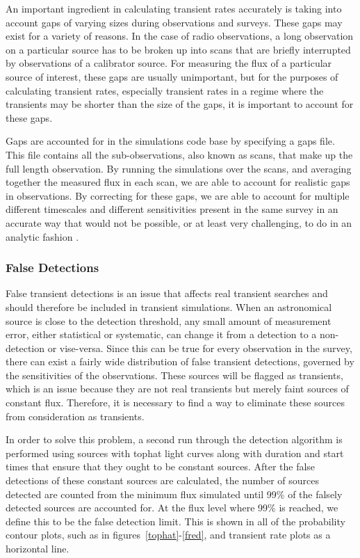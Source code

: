 \documentclass[12pt]{article}
\begin{document}
An important ingredient in calculating transient rates accurately is taking into account gaps of varying sizes during observations and surveys. These gaps may exist for a variety of reasons. In the case of radio observations, a long observation on a particular source has to be broken up into scans that are briefly interrupted by observations of a calibrator source. For measuring the flux of a particular source of interest, these gaps are usually unimportant, but for the purposes of calculating transient rates, especially transient rates in a regime where the transients may be shorter than the size of the gaps, it is important to account for these gaps. 

Gaps are accounted for in the simulations code base by specifying a gaps file. This file contains all the sub-observations, also known as scans, that make up the full length observation. By running the simulations over the scans, and averaging together the measured flux in each scan, we are able to account for realistic gaps in observations. By correcting for these gaps, we are able to account for multiple different timescales and different sensitivities present in the same survey in an accurate way that would not be possible, or at least very challenging, to do in an analytic fashion \citep{2016MNRAS.459.3161C}.




\subsubsection{False Detections}
False transient detections is an issue that affects real transient searches and should therefore be included in transient simulations. When an astronomical source is close to the detection threshold, any small amount of measurement error, either statistical or systematic, can change it from a detection to a non-detection or vise-versa. Since this can be true for every observation in the survey, there can exist a fairly wide distribution of false transient detections, governed by the sensitivities of the observations. These sources will be flagged as transients, which is an issue because they are not real transients but merely faint sources of constant flux. Therefore, it is necessary to find a way to eliminate these sources from consideration as transients. 

In order to solve this problem, a second run through the detection algorithm is performed using sources with tophat light curves along with duration and start times that ensure that they ought to be constant sources. After the false detections of these constant sources are calculated, the number of sources detected are counted from the minimum flux simulated until 99\% of the falsely detected sources are accounted for. At the flux level where 99\% is reached, we define this to be the false detection limit. This is shown in all of the probability contour plots, such as in figures~\ref{tophat}-\ref{fred}, and transient rate plots as a horizontal line. 
\end{document}
